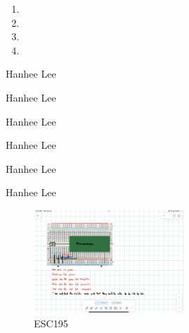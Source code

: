 \documentclass{article}
\begin{document}
\begin{process}
    \begin{enumerate}
        \item 
        \item 
        \item 
        \item 
    \end{enumerate}
\end{process}

\begin{example}
    Hanhee Lee
\end{example}

\begin{definition}
    
\end{definition}

\begin{theorem}
    Hanhee Lee
\end{theorem}

\begin{derivation}
    Hanhee Lee
\end{derivation}

\begin{intuition}
    Hanhee Lee
\end{intuition}

\begin{warning}
    Hanhee Lee
\end{warning}

\begin{summary}
    Hanhee Lee
\end{summary}

\begin{figure}[H]
    \centering
    \includegraphics[width=0.5\textwidth]{00_Images/diagram_circuit.png}
    \caption{ESC195}
\end{figure}
\end{document}
